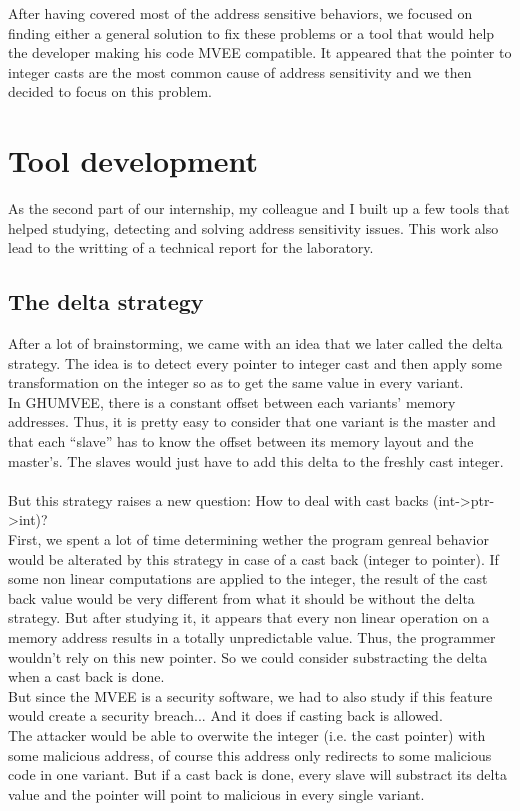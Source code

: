\documentclass[english]{enstaPRE}
\begin{document}
After having covered most of the address sensitive behaviors, we focused on finding either a general solution to fix these 
problems or a tool that would help the developer making his code MVEE compatible.
It appeared that the pointer to integer casts are the most common cause of address sensitivity and we then decided to focus on this 
problem.

\chapter{Tool development}

As the second part of our internship, my colleague and I built up a few tools that helped studying, detecting and solving address
sensitivity issues. This work also lead to the writting of a technical report for the laboratory.

\section{The delta strategy}

After a lot of brainstorming, we came with an idea that we later called the delta strategy.
The idea is to detect every pointer to integer cast and then apply some transformation on the integer so as to get the same value
in every variant. \\
In GHUMVEE, there is a constant offset between each variants' memory addresses. Thus, it is pretty easy to consider that one
variant is the master and that each ``slave'' has to know the offset between its memory layout and the master's.
The slaves would just have to add this delta to the freshly cast integer. \\ 
 \\
But this strategy raises a new question: How to deal with cast backs (int->ptr->int)? \\ First, we spent a lot of time determining wether the program
genreal behavior would be alterated by this strategy in case of a cast back (integer to pointer). If some non linear computations
are applied to the integer, the result of the cast back value would be very different from what it should be without the delta 
strategy. But after studying it, it appears that every non linear operation on a memory address results in a totally unpredictable
value. Thus, the programmer wouldn't rely on this new pointer. So we could consider substracting the delta when a cast back is done. \\
But since the MVEE is a security software, we had to also study if this feature would create a security breach... And it does if casting
back is allowed. \\ The attacker would be able to overwite the integer (i.e. the cast pointer) with some malicious address, of course
this address only redirects to some malicious code in one variant. But if a cast back is done, every slave will substract its delta
value and the pointer will point to malicious in every single variant. \\ 
 \\
\end{document}
